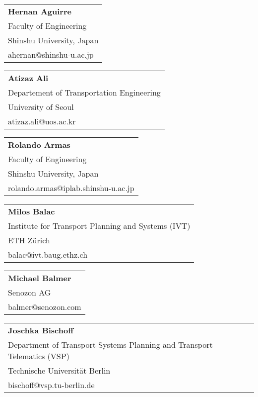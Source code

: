 \begin{tabular}[width=0.48\textwidth]{l}
\textbf{Hernan Aguirre} \\
Faculty of Engineering \\
Shinshu University, Japan \\
ahernan@shinshu-u.ac.jp  \\
\end{tabular}

\begin{tabular}[width=0.48\textwidth]{l}
\textbf{Atizaz Ali} \\
Departement of Transportation Engineering \\
University of Seoul \\
atizaz.ali@uos.ac.kr \\
\end{tabular}

\begin{tabular}[width=0.48\textwidth]{l}
\textbf{Rolando Armas} \\
Faculty of Engineering \\
Shinshu University, Japan \\
rolando.armas@iplab.shinshu-u.ac.jp \\
\end{tabular}

\begin{tabular}[width=0.48\textwidth]{l}
\textbf{Milos Balac} \\
Institute for Transport Planning and Systems (IVT) \\
ETH Zürich \\
balac@ivt.baug.ethz.ch \\
\end{tabular}

\begin{tabular}[width=0.48\textwidth]{l}
\textbf{Michael Balmer} \\
Senozon AG \\
balmer@senozon.com \\
\end{tabular}

\begin{tabular}[width=0.48\textwidth]{l}
\textbf{Joschka Bischoff} \\
Department of Transport Systems Planning and Transport Telematics (VSP) \\
Technische Universität Berlin \\
bischoff@vsp.tu-berlin.de \\
\end{tabular}

